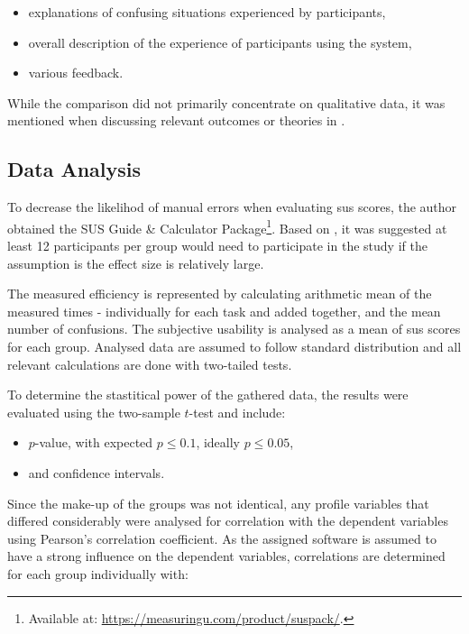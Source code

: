 \begin{itemize}
    \item explanations of confusing situations experienced by participants,
    \item overall description of the experience of participants using the system,
    \item various feedback.
\end{itemize}

While the comparison did not primarily concentrate on qualitative data, it was mentioned when discussing relevant outcomes or theories in .

\subsection{Data Analysis}
\label{sec:methodology-data-analysis}

To decrease the likelihod of manual errors when evaluating \gls{sus} scores, the author obtained the SUS Guide \& Calculator Package\footnote{Available at: \url{https://measuringu.com/product/suspack/}.}.
Based on , it was suggested at least 12 participants per group would need to participate in the study if the assumption is the effect size is relatively large.

The measured efficiency is represented by calculating arithmetic mean of the measured times - individually for each task and added together, and the mean number of confusions.
The subjective usability is analysed as a mean of \gls{sus} scores for each group.
Analysed data are assumed to follow standard distribution and all relevant calculations are done with two-tailed tests.

To determine the stastitical power of the gathered data, the results were evaluated using the two-sample $t$-test and include:

\begin{itemize}
    \item $p$-value, with expected $p \leq 0.1 $, ideally $p \leq 0.05 $,
    \item and confidence intervals.
\end{itemize}

Since the make-up of the groups was not identical, any profile variables that differed considerably were analysed for correlation with the dependent variables using Pearson's correlation coefficient.
As the assigned software is assumed to have a strong influence on the dependent variables, correlations are determined for each group individually with:

